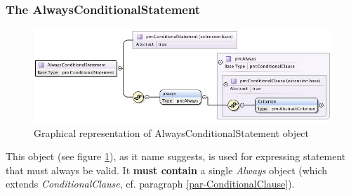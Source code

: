 \documentclass[a4paper,11pt] {ivoa}
\begin{document}
\subsubsection{The AlwaysConditionalStatement}\label{par-AlwaysConditionalStatement}
\begin{figure}[htbp]
\begin{center}
\includegraphics[width=1.1\textwidth]{pictures/AlwaysStatement.jpg} 
\caption{Graphical representation of AlwaysConditionalStatement object}
\label{Pic-AlwaysConditionalStatement}
\end{center}
\end{figure}
This object (see figure \ref{Pic-AlwaysConditionalStatement}), as it name suggests,  is used
for expressing statement that must always be valid. It {\bf must contain} a single {\it Always}
object (which extends {\it ConditionalClause}, cf. paragraph \ref{par-ConditionalClause}).
\end{document}
